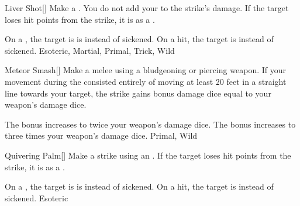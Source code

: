 \lowercase{\hypertarget{maneuver:Liver Shot}{}}\label{maneuver:Liver Shot}
\hypertarget{maneuver:Liver Shot}{}
\begin{freeability}[Rank 3]{Liver Shot}[]
Make a .
You do not add your  to the strike's damage.
If the target loses hit points from the strike, it is  as a .

\rankline
{} On a , the target is is  instead of sickened.
 On a hit, the target is  instead of sickened.
 Esoteric, Martial, Primal, Trick, Wild
\end{freeability}
\vspace{0.25em}



\lowercase{\hypertarget{maneuver:Meteor Smash}{}}\label{maneuver:Meteor Smash}
\hypertarget{maneuver:Meteor Smash}{}
\begin{freeability}[Rank 3]{Meteor Smash}[]
Make a melee  using a bludgeoning or piercing weapon.
If your movement during the  consisted entirely of moving at least 20 feet in a straight line towards your target, the strike gains bonus damage dice equal to your weapon's damage dice.

\rankline
{} The bonus increases to twice your weapon's damage dice.
 The bonus increases to three times your weapon's damage dice.
 Primal, Wild
\end{freeability}
\vspace{0.25em}



\lowercase{\hypertarget{maneuver:Quivering Palm}{}}\label{maneuver:Quivering Palm}
\hypertarget{maneuver:Quivering Palm}{}
\begin{freeability}[Rank 3]{Quivering Palm}[]
Make a strike using an .
If the target loses hit points from the strike, it is  as a .

\rankline
{} On a , the target is is  instead of sickened.
 On a hit, the target is  instead of sickened.
 Esoteric
\end{freeability}
\vspace{0.25em}




